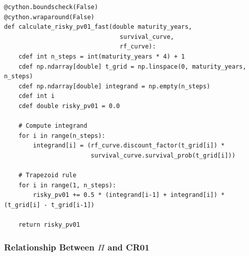 \documentclass[11pt,a4paper]{article}
\begin{document}
\begin{implbox}
\begin{lstlisting}
@cython.boundscheck(False)
@cython.wraparound(False)
def calculate_risky_pv01_fast(double maturity_years,
                                survival_curve,
                                rf_curve):
    cdef int n_steps = int(maturity_years * 4) + 1
    cdef np.ndarray[double] t_grid = np.linspace(0, maturity_years, n_steps)
    cdef np.ndarray[double] integrand = np.empty(n_steps)
    cdef int i
    cdef double risky_pv01 = 0.0
    
    # Compute integrand
    for i in range(n_steps):
        integrand[i] = (rf_curve.discount_factor(t_grid[i]) * 
                        survival_curve.survival_prob(t_grid[i]))
    
    # Trapezoid rule
    for i in range(1, n_steps):
        risky_pv01 += 0.5 * (integrand[i-1] + integrand[i]) * (t_grid[i] - t_grid[i-1])
    
    return risky_pv01
\end{lstlisting}
\end{implbox}

\subsubsection{Relationship Between $\Pi$ and CR01}
\end{document}

